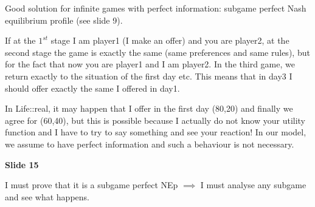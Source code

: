 \documentclass[pt11,a4paper,twoside,reqno,openright]{paper}
\begin{document}
\noindent Good solution for infinite games with perfect information: subgame 
perfect Nash equilibrium profile (see slide 9).

\noindent If at the $1^{st}$ stage I am player1 (I make an offer) and you are 
player2, at the second stage the game is exactly the same (same preferences 
and same rules), but for the fact that now you are player1 and I am player2. In 
the third game, we return exactly to the situation of the first day etc. This 
means that in day3 I should offer exactly the same I offered in day1.

\noindent In Life::real, it may happen that I offer in the first day (80,20) and 
finally we agree for (60,40), but this is possible because I actually do not 
know your utility function and I have to try to say something and see your 
reaction! In our model, we assume to have perfect information and such a 
behaviour is not necessary.

\bigskip
\noindent \textbf{Slide 15}

\noindent I must prove that it is a subgame perfect NEp $\implies$ I must 
analyse any subgame and see what happens.
\end{document}
